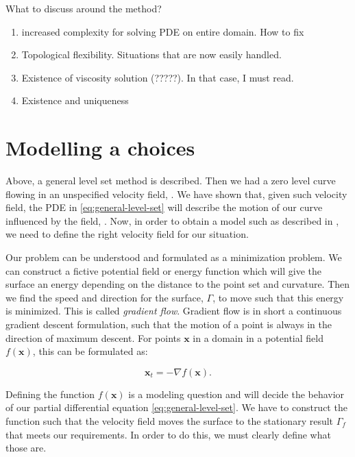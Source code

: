 What to discuss around the method?
\begin{enumerate}
    \item increased complexity for solving PDE on entire domain. How to fix
    \item Topological flexibility. Situations that are now easily handled.
    \item Existence of viscosity solution (?????). In that case, I must read.
    \item Existence and uniqueness
\end{enumerate}

\newpage
\section{Modelling a choices}
Above, a general level set method is described. Then we had a zero level curve flowing in an unspecified velocity field, \velocityfield. We have shown that, given such velocity field, the PDE in \eqref{eq:general-level-set} will describe the motion of our curve influenced by the field, \velocityfield. Now, in order to obtain a model such as described in , we need to define the right velocity field for our situation.

Our problem can be understood and formulated as a minimization problem. We can construct a fictive potential field or energy function which will give the surface an energy depending on the distance to the point set and curvature. Then we find the speed and direction for the surface, $\Gamma$, to move such that this energy is minimized. This is called \textit{gradient flow}. Gradient flow is in short a continuous gradient descent formulation, such that the motion of a point is always in the direction of maximum descent. For points $\mathbf{x}$ in a domain \domain in a potential field $f(\mathbf{x})$, this can be formulated as:

\begin{equation}
    \mathbf{x}_t = -\nabla f(\mathbf{x}).
    \label{eq:grad-flow}
\end{equation}

Defining the function $f(\mathbf{x})$ is a modeling question and will decide the behavior of our partial differential equation \eqref{eq:general-level-set}. We have to construct the function such that the velocity field moves the surface to the stationary result $\Gamma_f$ that meets our requirements. In order to do this, we must clearly define what those are.

